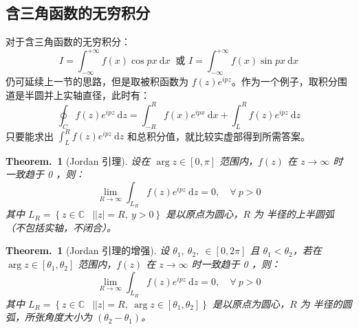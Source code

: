 \documentclass[UTF8]{report}
\def\C{\mathbb{C}}
\theoremstyle{MyLineTheoremStyle} %
\theoremstyle{MyBlockTheoremStyle} %
\newtheorem{BlockTheorem}[LineTheorem]{Theorem.\,} %
\theoremstyle{MySubsubsectionStyle} %
\begin{document}
\subsection{含三角函数的无穷积分}
对于含三角函数的无穷积分：
\begin{equation}
I = \int_{-\infty}^{+\infty} f(x) \cos px \ \mathrm{d} x \ \text{\ 或\ } I = \int_{-\infty}^{+\infty} f(x) \sin px \ \mathrm{d} x
\end{equation}
仍可延续上一节的思路，但是取被积函数为 $f(z)e^{ipz}$。作为一个例子，取积分围道是半圆并上实轴直径，此时有：
\begin{equation}
\oint_{C} f(z) e^{ipz} \ \mathrm{d} z 
= \int_{-R}^{R} f(x) e^{ipx} \ \mathrm{d}x 
+ \int_{L}^{R} f(z) e^{ipz} \ \mathrm{d}z
\end{equation}
只要能求出 $\int_{L}^{R} f(z) e^{ipz} \ \mathrm{d}z$ 和总积分值，就比较实虚部得到所需答案。


\begin{BlockTheorem}[Jordan 引理]\label{Jordan 引理}
设在 $\arg z \in [0, \pi]$  范围内，$f(z)$ 在 $z \to \infty$ 时一致趋于 0 ，则：
\begin{equation}
\lim_{R \to \infty} 
\int_{L_R} 
f(z) e^{ipz} \ \mathrm{d} z = 0
,\quad \forall\ p > 0
\end{equation}
其中 $L_R = \left\{z \in \C \left.\begin{matrix}\\\end{matrix}\right| | z | = R,\ y > 0\right\}$ 是以原点为圆心，$R$ 为
半径的上半圆弧（不包括实轴，不闭合）。
\end{BlockTheorem}

\begin{BlockTheorem}[Jordan 引理的增强]\label{Jordan 引理的增强}
    设 $\theta_1,\ \theta_2,\ \in [0, 2\pi]$ 且 $\theta_1 < \theta_2$，若在 $\arg z \in [\theta_1, \theta_2]$ 范围内，$f(z)$ 在 $z \to \infty$ 时一致趋于 0 ，则：
    \begin{equation}
    \lim_{R \to \infty} 
    \int_{L_R} 
    f(z) e^{ipz} \ \mathrm{d} z = 0
    ,\quad \forall\ p > 0
    \end{equation}
    其中 $L_R = \left\{z \in \C \left.\begin{matrix}\\\end{matrix}\right| | z | = R,\ \arg z \in [\theta_1, \theta_2]\right\}$ 是以原点为圆心，$R$ 为
    半径的圆弧，所张角度大小为 $(\theta_2 - \theta_1)$。
\end{BlockTheorem}
\end{document}
